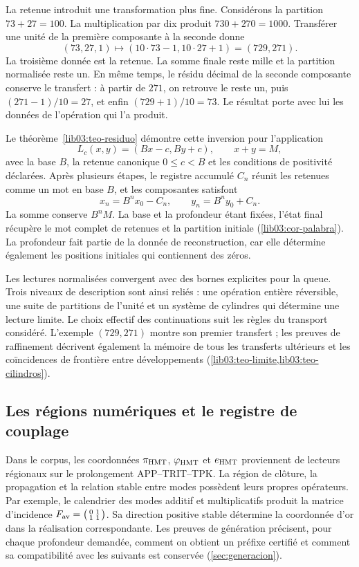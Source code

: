 La retenue introduit une transformation plus fine. Considérons la
partition \(73+27=100\). La multiplication par dix produit
\(730+270=1000\). Transférer une unité de la première composante à
la seconde donne
\[
 (73,27,1)\longmapsto(10\cdot73-1,10\cdot27+1)
                  =(729,271).
\]
La troisième donnée est la retenue. La somme finale reste mille et la
partition normalisée reste un. En même temps, le résidu décimal
de la seconde composante conserve le transfert : à partir de \(271\), on
retrouve le reste un, puis \((271-1)/10=27\), et enfin
\((729+1)/10=73\). Le résultat porte avec lui les données de
l’opération qui l’a produit.

Le théorème~\ref{lib03:teo-residuo} démontre cette inversion pour l’application
\[
 L_c(x,y)=(Bx-c,By+c),\qquad x+y=M,
\]
avec la base \(B\), la retenue canonique \(0\leq c<B\) et les conditions
de positivité déclarées. Après plusieurs étapes, le registre accumulé
\(C_n\) réunit les retenues comme un mot en base \(B\), et les
composantes satisfont
\[
 x_n=B^n x_0-C_n,\qquad y_n=B^n y_0+C_n.
\]
La somme conserve \(B^nM\). La base et la profondeur étant fixées, l'état final récupère le mot complet de retenues et la partition initiale (\cref{lib03:cor-palabra}). La profondeur fait partie de la donnée de reconstruction, car elle détermine également les positions initiales qui contiennent des zéros.

Les lectures normalisées convergent avec des bornes explicites pour la queue.
Trois niveaux de description sont ainsi reliés : une opération entière
réversible, une suite de partitions de l’unité et un système de
cylindres qui détermine une lecture limite. Le choix effectif des
continuations suit les règles du transport considéré. L’exemple
\((729,271)\) montre son premier transfert ; les preuves de
raffinement décrivent également la mémoire de tous les transferts
ultérieurs et les coïncidences de frontière entre développements
(\cref{lib03:teo-limite,lib03:teo-cilindros}).

\subsection*{Les régions numériques et le registre de couplage}
\label{libnar:registro}

Dans le corpus, les coordonnées \(\pi_{\rm HMT}\), \(\varphi_{\rm HMT}\) et \(e_{\rm HMT}\) proviennent de lecteurs régionaux sur le prolongement APP--TRIT--TPK. La région de clôture, la propagation et la relation stable entre modes possèdent leurs propres opérateurs. Par exemple, le calendrier des modes additif et multiplicatifs produit la matrice d'incidence \(F_{\rm av}=\bigl(\begin{smallmatrix}0&1\\1&1\end{smallmatrix}\bigr)\).
Sa direction positive stable détermine la coordonnée d’or dans la
réalisation correspondante. Les preuves de génération précisent, pour
chaque profondeur demandée, comment on obtient un préfixe certifié et
comment sa compatibilité avec les suivants est conservée
(\cref{sec:generacion}).

